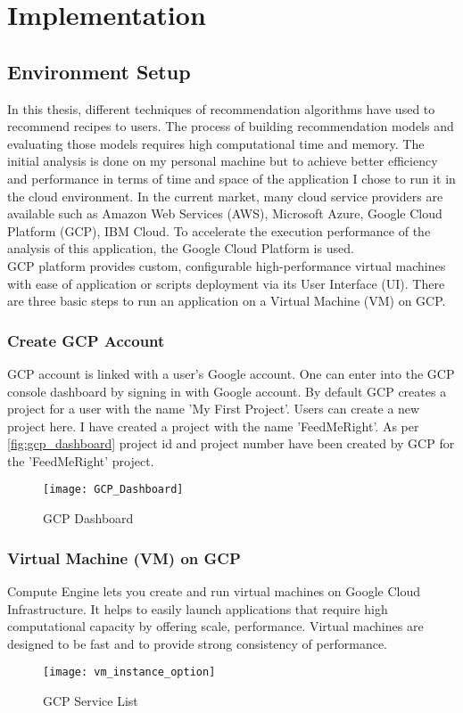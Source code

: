 \chapter{Implementation}
\section{Environment Setup}
In this thesis, different techniques of recommendation algorithms have used to recommend recipes to users. The process of building recommendation models and evaluating those models requires high computational time and memory. The initial analysis is done on my personal machine but to achieve better efficiency and performance in terms of time and space of the application I chose to run it in the cloud environment.  In the current market, many cloud service providers are available such as Amazon Web Services (AWS), Microsoft Azure, Google Cloud Platform (GCP), IBM Cloud. To accelerate the execution performance of the analysis of this application, the Google Cloud Platform is used. \\
\noindent GCP platform provides custom, configurable high-performance virtual machines with ease of application or scripts deployment via its User Interface (UI). There are three basic steps to run an application on a Virtual Machine (VM) on GCP. 
\subsection{Create GCP Account}
GCP account is linked with a user's Google account. One can enter into the GCP console dashboard by signing in with Google account. By default GCP creates a project for a user with the name 'My First Project'. Users can create a new project here. I have created a project with the name 'FeedMeRight'. As per \autoref{fig:gcp_dashboard} project id and project number have been created by GCP for the 'FeedMeRight' project. 
\begin{figure}[H]
	\centering
	\texttt{[image: GCP\_Dashboard]}
	\caption{GCP Dashboard}
	\label{fig:gcp_dashboard}
\end{figure}
  
\subsection{Virtual Machine (VM) on GCP}
Compute Engine lets you create and run virtual machines on Google Cloud Infrastructure. It helps to easily launch applications that require high computational capacity by offering scale, performance. Virtual machines are designed to be fast and to provide strong consistency of performance. 
\begin{figure}[H]
	\centering
	\texttt{[image: vm\_instance\_option]}
	\caption{GCP Service List}
	\label{fig:vm_instance_option}
\end{figure}

